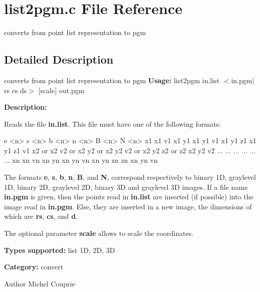 \section{list2pgm.c File Reference}
\label{list2pgm_8c}


converts from point list representation to pgm  




\subsection{Detailed Description}
converts from point list representation to pgm {\bfseries Usage:} list2pgm in.list $<$in.pgm$|$rs cs ds$>$ [scale] out.pgm

{\bfseries Description:}

Reads the file {\bfseries in.list}. This file must have one of the following formats: 
\begin{DoxyPre}  
  e <n>       s <n>         b <n>         n <n>            B <n>            N <n>    
  x1          x1 v1         x1 y1         x1 y1 v1         x1 y1 z1         x1 y1 z1 v1
  x2    or    x2 v2   or    x2 y2   or    x2 y2 v2   or    x2 y2 z2   or    z2 x2 y2 v2
  ...         ...           ...           ...              ...              ...
  xn          xn vn         xn yn         xn yn vn         xn yn zn         zn xn yn vn
\end{DoxyPre}
 The formats {\bfseries e}, {\bfseries s}, {\bfseries b}, {\bfseries n}, {\bfseries B}, and {\bfseries N}, correspond respectively to binary 1D, graylevel 1D, binary 2D, graylevel 2D, binary 3D and graylevel 3D images. If a file name {\bfseries in.pgm} is given, then the points read in {\bfseries in.list} are inserted (if possible) into the image read in {\bfseries in.pgm}. Else, they are inserted in a new image, the dimensions of which are {\bfseries rs}, {\bfseries cs}, and {\bfseries d}.

The optional parameter {\bfseries scale} allows to scale the coordinates.

{\bfseries Types supported:} list 1D, 2D, 3D

{\bfseries Category:} convert

\begin{DoxyAuthor}{Author}
Michel Couprie 
\end{DoxyAuthor}
